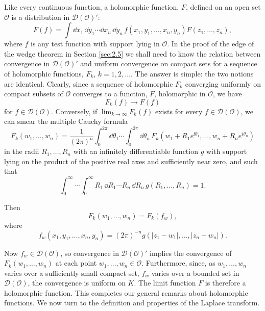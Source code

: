 Like every continuous function, a holomorphic function, $F$, defined on an
open set $\mathcal{O}$ is a distribution in $\mathcal{D}(\mathcal{O})'$:
\begin{equation*}
  F(f)=\int \dd x_1\,\dd y_1\cdots \dd x_n\,\dd y_n\,
  f(x_1,y_1,\ldots,x_n,y_n)F(z_1,\ldots,z_n),
\end{equation*}
where $f$ is any test function with support lying in $\mathcal{O}$.  In
the proof of the edge of the wedge theorem in Section \ref{sec:2.5} we shall need to
know the relation between convergence in $\mathcal{D}(\mathcal{O})'$ and
uniform convergence on compact sets for a sequence of holomorphic
functions, $F_k$, $k=1,2,\ldots$.  The answer is simple: the two notions are
identical.  Clearly, since a sequence of holomorphic $F_k$ converging
uniformly on compact subsets of $\mathcal{O}$ converges to a function, $F$,
holomorphic in $\mathcal{O}$, we have
\begin{equation}
  F_k(f)\longrightarrow F(f)
  \tag{2-61}\label{eq:ch2-holomorphic-distribution-convergence}
\end{equation}
for $f\in\mathcal{D}(\mathcal{O})$.  Conversely, if
$\lim_{k\to\infty}F_k(f)$ exists for every $f\in\mathcal{D}(\mathcal{O})$,
we can smear the multiple Cauchy formula
\begin{equation*}
  F_k(w_1,\ldots,w_n)=\frac{1}{(2\pi)^n}
  \int_0^{2\pi}\dd\theta_1\cdots\int_0^{2\pi}\dd\theta_n\,
  F_k(w_1+R_1e^{\ii\theta_1},\ldots,w_n+R_ne^{i\theta_n})
\end{equation*}
in the radii $R_1,\ldots,R_n$ with an infinitely differentiable function
$g$ with support lying on the product of the positive real axes and
sufficiently near zero, and such that
\begin{equation*}
  \int_0^\infty\!\cdots\!\int_0^\infty
  R_1\,\dd R_1\cdots R_n\,\dd R_n\,g(R_1,\ldots,R_n)=1.
\end{equation*}

Then
\begin{equation*}
  F_k(w_1,\ldots,w_n)=F_k(f_w),
\end{equation*}
where
\begin{equation*}
  f_w(x_1,y_1,\ldots,x_n,y_n)
  =(2\pi)^{-n}g(|z_1-w_1|,\ldots,|z_n-w_n|).
\end{equation*}

Now $f_w\in\mathcal{D}(\mathcal{O})$, so convergence in
$\mathcal{D}(\mathcal{O})'$ implies the convergence of
$F_k(w_1,\ldots,w_n)$ at each point $w_1,\ldots,w_n\in\mathcal{O}$.
Furthermore, since, as $w_1,\ldots,w_n$ varies over a sufficiently small
compact set, $f_w$ varies over a bounded set in $\mathcal{D}(\mathcal{O})$,
the convergence is uniform on $K$.  The limit function $F$ is therefore a
holomorphic function.  This completes our general remarks about holomorphic
functions.  We now turn to the definition and properties of the Laplace
transform.

